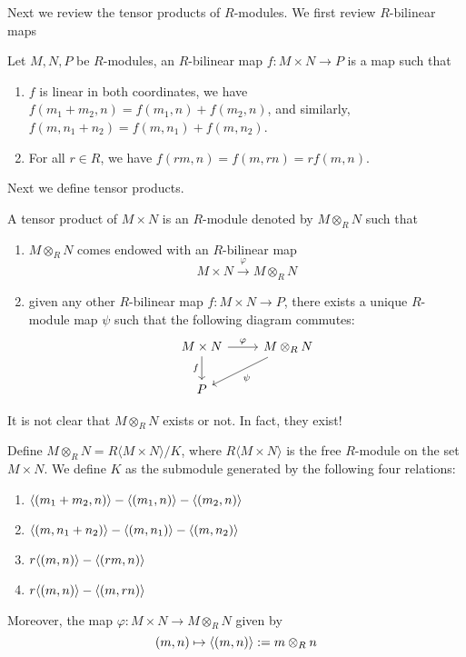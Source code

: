 Next we review the tensor products of $R$-modules. We first review $R$-bilinear maps 
\begin{defn}
    Let $M,N, P$ be $R$-modules, an $R$-bilinear map $f:M\times N\to P$ is a map such that 
    \begin{enumerate}
        \item $f$ is linear in both coordinates, we have $f(m_1+m_2,n)=f(m_1,n)+f(m_2,n)$, and similarly, $f(m,n_1+n_2)=f(m,n_1)+f(m,n_2)$.
        \item For all $r\in R$, we have $f(rm,n)=f(m,rn)=rf(m,n)$.
    \end{enumerate}
\end{defn}
Next we define tensor products.
\begin{defn}
    A tensor product of $M\times N$ is an $R$-module denoted by $M\otimes_R N$ such that 
    \begin{enumerate}
        \item $M\otimes_R N$ comes endowed with an $R$-bilinear map 
        \begin{equation*}
            M\times N\xrightarrow{\varphi}M\otimes_RN
        \end{equation*}
        \item given any other $R$-bilinear map $f: M\times N\to P$, there exists a unique $R$-module map $\psi$ such that the following diagram commutes:
        \[\begin{tikzcd}
            {M\times N} & {M\otimes_RN} \\
            P
            \arrow["\varphi", from=1-1, to=1-2]
            \arrow["f"', from=1-1, to=2-1]
            \arrow["\psi", from=1-2, to=2-1]
        \end{tikzcd}\]
    \end{enumerate}
\end{defn}
It is not clear that $M\otimes_RN$ exists or not. In fact, they exist!
\begin{thm}
    Define $M\otimes_RN=R\langle M\times N\rangle/K$, where $R\langle M\times N\rangle$ is the free $R$-module on the set $M\times N$. We define $K$ as the submodule generated by the following four relations:
    \begin{enumerate}
        \item $\langle(m_1+m_2,n)\rangle-\langle(m_1,n)\rangle-\langle(m_2,n)\rangle$
        \item $\langle(m,n_1+n_2)\rangle-\langle(m,n_1)\rangle-\langle(m,n_2)\rangle$
        \item $r\langle(m,n)\rangle-\langle(rm,n)\rangle$
        \item $r\langle(m,n)\rangle-\langle(m,rn)\rangle$
    \end{enumerate}
    Moreover, the map $\varphi:M\times N\to M\otimes_RN$ given by 
    \begin{equation*}
        (m,n)\mapsto \langle(m,n)\rangle:=m\otimes_Rn
    \end{equation*}
\end{thm}
